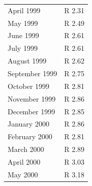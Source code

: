 \begin{description}[noitemsep]
\begin{description}[noitemsep]
\begin{table}[H]
\begin{center}
\begin{xtabular}[t]{|l|l|}
        April 1999 &
        R 2.31%
     \tabularnewline{}
        May 1999 &
        R 2.49%
     \tabularnewline{}
        June 1999 &
        R 2.61%
     \tabularnewline{}
        July 1999 &
        R 2.61%
     \tabularnewline{}
        August 1999 &
        R 2.62%
     \tabularnewline{}
        September 1999 &
        R 2.75%
     \tabularnewline{}
        October 1999 &
        R 2.81%
     \tabularnewline{}
        November 1999 &
        R 2.86%
     \tabularnewline{}
        December 1999 &
        R 2.85%
     \tabularnewline{}
        January 2000 &
        R 2.86%
     \tabularnewline{}
        February 2000 &
        R 2.81%
     \tabularnewline{}
        March 2000 &
        R 2.89%
     \tabularnewline{}
        April 2000 &
        R 3.03%
     \tabularnewline{}
        May 2000 &
        R 3.18%
     \tabularnewline{}

\end{xtabular}
\end{center}
\end{table}
\end{description}
\end{description}
